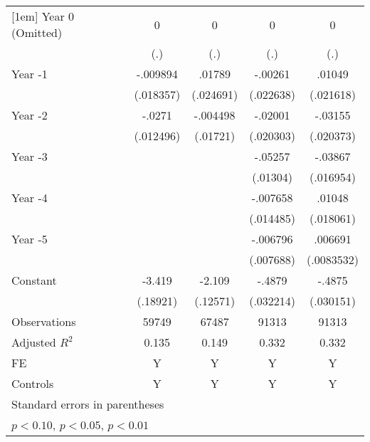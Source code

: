 \begin{table}[htbp]
\begin{tabular}{l*{4}{c}}
[1em]
Year 0 (Omitted)    &           0         &           0         &           0         &           0         \\
                    &         (.)         &         (.)         &         (.)         &         (.)         \\
[1em]
Year -1             &    -.009894         &      .01789         &     -.00261         &      .01049         \\
                    &   (.018357)         &   (.024691)         &   (.022638)         &   (.021618)         \\
[1em]
Year -2             &      -.0271\sym{**} &    -.004498         &     -.02001         &     -.03155         \\
                    &   (.012496)         &    (.01721)         &   (.020303)         &   (.020373)         \\
[1em]
Year -3             &                     &                     &     -.05257\sym{***}&     -.03867\sym{**} \\
                    &                     &                     &    (.01304)         &   (.016954)         \\
[1em]
Year -4             &                     &                     &    -.007658         &      .01048         \\
                    &                     &                     &   (.014485)         &   (.018061)         \\
[1em]
Year -5             &                     &                     &    -.006796         &     .006691         \\
                    &                     &                     &   (.007688)         &  (.0083532)         \\
[1em]
Constant            &      -3.419\sym{***}&      -2.109\sym{***}&      -.4879\sym{***}&      -.4875\sym{***}\\
                    &    (.18921)         &    (.12571)         &   (.032214)         &   (.030151)         \\
\hline
Observations        &       59749         &       67487         &       91313         &       91313         \\
Adjusted \(R^{2}\)  &       0.135         &       0.149         &       0.332         &       0.332         \\
FE                  &           Y         &           Y         &           Y         &           Y         \\
Controls            &           Y         &           Y         &           Y         &           Y         \\
\hline\hline
\multicolumn{5}{l}{\footnotesize Standard errors in parentheses}\\
\multicolumn{5}{l}{\footnotesize \sym{*} \(p<0.10\), \sym{**} \(p<0.05\), \sym{***} \(p<0.01\)}\\
\end{tabular}
\end{table}
